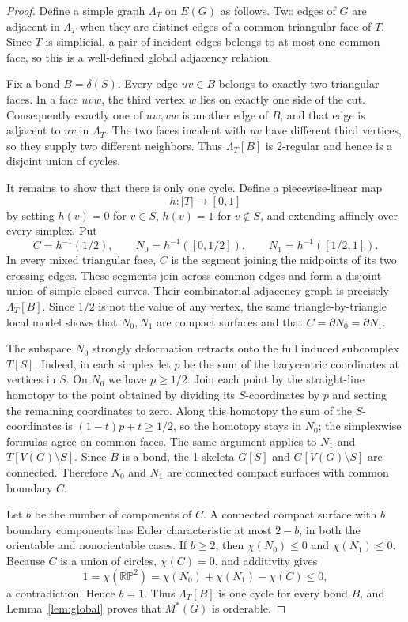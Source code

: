 \documentclass[11pt]{article}
\newcommand{\RP}{\mathbb{RP}}
\begin{document}
\begin{proof}
Define a simple graph $\Lambda_T$ on $E(G)$ as follows. Two edges of $G$ are
adjacent in $\Lambda_T$ when they are distinct edges of a common triangular
face of $T$. Since $T$ is simplicial, a pair of incident edges belongs to at
most one common face, so this is a well-defined global adjacency relation.

Fix a bond $B=\delta(S)$. Every edge $uv\in B$ belongs to exactly two
triangular faces. In a face $uvw$, the third vertex $w$ lies on exactly one
side of the cut. Consequently exactly one of $uw,vw$ is another edge of $B$,
and that edge is adjacent to $uv$ in $\Lambda_T$. The two faces incident with
$uv$ have different third vertices, so they supply two different neighbors.
Thus $\Lambda_T[B]$ is 2-regular and hence is a disjoint union of cycles.

It remains to show that there is only one cycle. Define a piecewise-linear map
\[
h:|T|\longrightarrow[0,1]
\]
by setting $h(v)=0$ for $v\in S$, $h(v)=1$ for $v\notin S$, and extending
affinely over every simplex. Put
\[
C=h^{-1}(1/2),\qquad
N_0=h^{-1}([0,1/2]),\qquad
N_1=h^{-1}([1/2,1]).
\]
In every mixed triangular face, $C$ is the segment joining the midpoints of
its two crossing edges. These segments join across common edges and form a
disjoint union of simple closed curves. Their combinatorial adjacency graph is
precisely $\Lambda_T[B]$. Since $1/2$ is not the value of any vertex, the same
triangle-by-triangle local model shows that $N_0,N_1$ are compact surfaces and
that $C=\partial N_0=\partial N_1$.

The subspace $N_0$ strongly deformation retracts onto the full induced
subcomplex $T[S]$. Indeed, in each simplex let $p$ be the sum of the
barycentric coordinates at vertices in $S$. On $N_0$ we have $p\ge 1/2$.
Join each point by the straight-line homotopy to the point obtained by dividing
its $S$-coordinates by $p$ and setting the remaining coordinates to zero.
Along this homotopy the sum of the $S$-coordinates is
$(1-t)p+t\ge1/2$, so the homotopy stays in $N_0$; the simplexwise formulas
agree on common faces. The same argument applies to $N_1$ and
$T[V(G)\setminus S]$. Since $B$ is a bond, the
1-skeleta $G[S]$ and $G[V(G)\setminus S]$ are connected. Therefore $N_0$ and
$N_1$ are connected compact surfaces with common boundary $C$.

Let $b$ be the number of components of $C$. A connected compact surface with
$b$ boundary components has Euler characteristic at most $2-b$, in both the
orientable and nonorientable cases. If $b\ge2$, then $\chi(N_0)\le0$ and
$\chi(N_1)\le0$. Because $C$ is a union of circles, $\chi(C)=0$, and additivity
gives
\[
1=\chi(\RP^2)=\chi(N_0)+\chi(N_1)-\chi(C)\le0,
\]
a contradiction. Hence $b=1$. Thus $\Lambda_T[B]$ is one cycle for every bond
$B$, and Lemma~\ref{lem:global} proves that $M^*(G)$ is orderable.
\end{proof}
\end{document}
